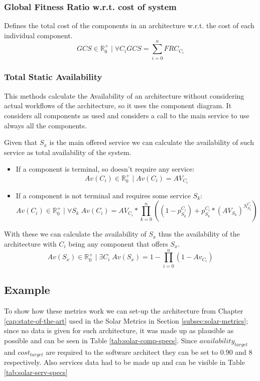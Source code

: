 \subsubsection{Global Fitness Ratio w.r.t. cost of system}
\label{met:gfrc}
Defines the total cost of the components in an architecture w.r.t. the cost of each individual component.
\[ GCS \in \mathbb{R}^+_0 \; | \; \forall C_i GCS = \sum_{i=0}^{n} FRC_{C_i} \]
\subsubsection{Total Static Availability}
\label{met:tsa}
This methods calculate the Availability of an architecture without considering actual workflows of the architecture, so it uses the component diagram. It considers all components as used and considers a call to the main service to use always all the components.

Given that $S_x$ is the main offered service we can calculate the availability of such service as total availability of the system.
\begin{itemize}
\item If a component is terminal, so doesn't require any service:
\[ Av(C_{i}) \in \mathbb{R}^+_0 \; | \; Av(C_{i}) = AV_{C_{i}} \]
\item  If a component is not terminal and requires some service $S_k$:
\[ Av(C_{i}) \in \mathbb{R}^+_0 \; | \; \forall S_k \; Av(C_{i}) = AV_{C_{i}}*\prod_{k=0}^{n} ((1-p_{S_k}^{C_{i}}) + p_{S_k}^{C_{i}} * (AV_{S_k})^{N_{S_k}^{C_i}}) \]
\end{itemize}
With these we can calculate the availability of $S_x$ thus the availability of the architecture with $C_i$ being any component that offers $S_x$.
\[ Av(S_x) \in \mathbb{R}^+_0 \; | \; \exists C_i \; Av(S_x) = 1-\prod_{i=0}^{n}(1-Av_{C_i}) \]


\subsection{Example}
To show how these metrics work we can set-up the architecture from Chapter \ref{cap:state-of-the-art} used in the Solar Metrics in Section \ref{subsec:solar-metrics}; since no data is given for such architecture, it was made up as plausible as possible and can be seen in Table \ref{tab:solar-comp-specs}. Since $availability_{target}$ and $cost_{target}$ are required to the software architect they can be set to $0.90$ and $8$ respectively. Also services data had to be made up and can be visible in Table \ref{tab:solar-serv-specs}

